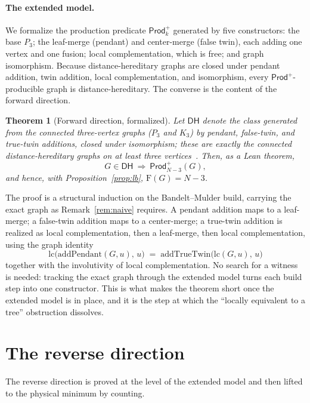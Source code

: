 \documentclass[11pt]{article}
\newtheorem{theorem}{Theorem}
\theoremstyle{definition}
\theoremstyle{remark}
\newcommand{\F}{\mathrm{F}}
\newcommand{\Prod}{\mathsf{Prod}}
\newcommand{\N}{N}
\begin{document}
\paragraph{The extended model.} We formalize the production predicate $\Prod^{+}_k$ generated by
five constructors: the base $P_3$; the leaf-merge (pendant) and center-merge (false twin), each
adding one vertex and one fusion; local complementation, which is free; and graph isomorphism.
Because distance-hereditary graphs are closed under pendant addition, twin addition, local
complementation, and isomorphism, every $\Prod^{+}$-producible graph is distance-hereditary. The
converse is the content of the forward direction.

\begin{theorem}[Forward direction, formalized]\label{thm:forward}
Let $\mathsf{DH}$ denote the class generated from the connected three-vertex graphs ($P_3$ and
$K_3$) by pendant, false-twin, and true-twin additions, closed under isomorphism; these are
exactly the connected distance-hereditary graphs on at least three
vertices~\cite{bandeltmulder}. Then, as a Lean theorem,
\[
  G\in\mathsf{DH}\ \Longrightarrow\ \Prod^{+}_{\N-3}(G),
\]
and hence, with Proposition~\ref{prop:lb}, $\F(G)=\N-3$.
\end{theorem}

The proof is a structural induction on the Bandelt--Mulder build, carrying the exact graph as
Remark~\ref{rem:naive} requires. A pendant addition maps to a leaf-merge; a false-twin addition
maps to a center-merge; a true-twin addition is realized as local complementation, then a
leaf-merge, then local complementation, using the graph identity
\[
  \mathrm{lc}\big(\mathrm{addPendant}(G,u),\,u\big)\;=\;\mathrm{addTrueTwin}\big(\mathrm{lc}(G,u),\,u\big)
\]
together with the involutivity of local complementation. No search for a witness is needed:
tracking the exact graph through the extended model turns each build step into one constructor.
This is what makes the theorem short once the extended model is in place, and it is the step at
which the ``locally equivalent to a tree'' obstruction dissolves.

\section{The reverse direction}\label{sec:reverse}

The reverse direction is proved at the level of the extended model and then lifted to the physical
minimum by counting.
\end{document}
